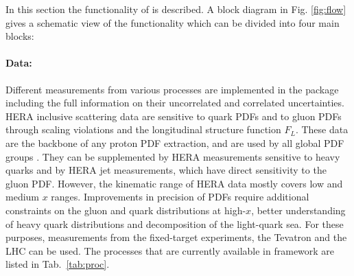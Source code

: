%
\label{sec:structure}


In this section the functionality of \fitter is described.
A block diagram in Fig. \ref{fig:flow} gives a schematic view
of the \fitter functionality which can be divided into four main blocks:

\paragraph{Data:} Different measurements from various processes
are implemented in the \fitter package including the full information on their uncorrelated 
and correlated uncertainties. HERA inclusive scattering data 
are sensitive to quark PDFs and to gluon PDFs through scaling violations and the longitudinal structure function $F_L$.  
These data are the backbone of any proton PDF extraction,
and are used by all global PDF groups \cite{MSTWpdf,CT10pdf,NNPDFpdf,Alekhin:2013nda,Jimenez-Delgado:2014twa}.  They can be supplemented by HERA measurements sensitive to heavy quarks and by HERA jet measurements, which have direct sensitivity to the gluon PDF.
However, the kinematic range of HERA data mostly covers low and medium $x$ ranges.
Improvements in precision of PDFs require additional constraints on the gluon and 
quark distributions at high-$x$, better understanding of heavy quark distributions and 
decomposition of the light-quark sea.  For these purposes, measurements from the fixed-target 
experiments, the Tevatron and the LHC can be used.
%
%
The processes that are currently available in \fitter framework are listed in Tab.~\ref{tab:proc}.


